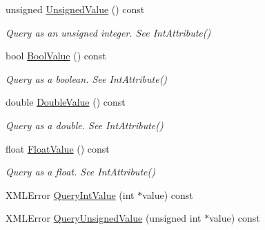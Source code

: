 \begin{DoxyCompactItemize}
\mbox{\label{classtinyxml2_1_1XMLAttribute_a0be5343b08a957c42c02c5d32c35d338}} 
unsigned \hyperlink{classtinyxml2_1_1XMLAttribute_a0be5343b08a957c42c02c5d32c35d338}{Unsigned\+Value} () const
\begin{DoxyCompactList}\small\item\em Query as an unsigned integer. See Int\+Attribute() \end{DoxyCompactList}\item 
\mbox{\label{classtinyxml2_1_1XMLAttribute_a98ce5207344ad33a265b0422addae1ff}} 
bool \hyperlink{classtinyxml2_1_1XMLAttribute_a98ce5207344ad33a265b0422addae1ff}{Bool\+Value} () const
\begin{DoxyCompactList}\small\item\em Query as a boolean. See Int\+Attribute() \end{DoxyCompactList}\item 
\mbox{\label{classtinyxml2_1_1XMLAttribute_a4aa73513f54ff0087d3e804f0f54e30f}} 
double \hyperlink{classtinyxml2_1_1XMLAttribute_a4aa73513f54ff0087d3e804f0f54e30f}{Double\+Value} () const
\begin{DoxyCompactList}\small\item\em Query as a double. See Int\+Attribute() \end{DoxyCompactList}\item 
\mbox{\label{classtinyxml2_1_1XMLAttribute_a27797b45d21c981257720db94f5f8801}} 
float \hyperlink{classtinyxml2_1_1XMLAttribute_a27797b45d21c981257720db94f5f8801}{Float\+Value} () const
\begin{DoxyCompactList}\small\item\em Query as a float. See Int\+Attribute() \end{DoxyCompactList}\item 
X\+M\+L\+Error \hyperlink{classtinyxml2_1_1XMLAttribute_a6d5176260db00ea301c01af8457cd993}{Query\+Int\+Value} (int $\ast$value) const
\item 
\mbox{\label{classtinyxml2_1_1XMLAttribute_a48a7f3496f1415832e451bd8d09c9cb9}} 
X\+M\+L\+Error \hyperlink{classtinyxml2_1_1XMLAttribute_a48a7f3496f1415832e451bd8d09c9cb9}{Query\+Unsigned\+Value} (unsigned int $\ast$value) const

\end{DoxyCompactItemize}
